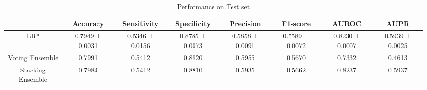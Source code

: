 \begin{table}[h!]
    \centering
    \caption{Performance on Test set}
    \begin{adjustbox}{width=\textwidth}
    \begin{tabular}{|c|c|c|c|c|c|c|c|}
    \hline
      & Accuracy & Sensitivity & Specificity & Precision & F1-score & AUROC & AUPR \\
    \hline
    LR* & 0.7949 ± 0.0031 & 0.5346 ± 0.0156 & 0.8785 ± 0.0073 & 0.5858 ± 0.0091 & 0.5589 ± 0.0072 & 0.8230 ± 0.0007 & 0.5939 ± 0.0025 \\
    \hline
    Voting Ensemble & 0.7991 & 0.5412 & 0.8820 & 0.5955 & 0.5670 & 0.7332 & 0.4613 \\
    \hline
    Stacking Ensemble & 0.7984 & 0.5412 & 0.8810 & 0.5935 & 0.5662 & 0.8237 & 0.5937 \\
    \hline
    \end{tabular}
    \end{adjustbox}
    \end{table}
    